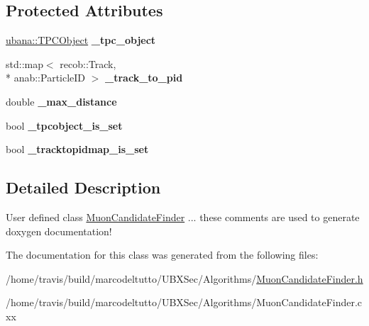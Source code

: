 \subsection*{Protected Attributes}
\begin{DoxyCompactItemize}
\item 
\hypertarget{classubxsec_1_1MuonCandidateFinder_ad9cc15de89d9470bda9d22d1aca4c015}{\hyperlink{classubana_1_1TPCObject}{ubana\-::\-T\-P\-C\-Object} {\bfseries \-\_\-tpc\-\_\-object}}\label{classubxsec_1_1MuonCandidateFinder_ad9cc15de89d9470bda9d22d1aca4c015}

\item 
\hypertarget{classubxsec_1_1MuonCandidateFinder_a83b91e5698c4485fc82020b7aeb15b83}{std\-::map$<$ recob\-::\-Track, \\*
anab\-::\-Particle\-I\-D $>$ {\bfseries \-\_\-track\-\_\-to\-\_\-pid}}\label{classubxsec_1_1MuonCandidateFinder_a83b91e5698c4485fc82020b7aeb15b83}

\item 
\hypertarget{classubxsec_1_1MuonCandidateFinder_a4f3bdddbb7e6f506410b493d8537285f}{double {\bfseries \-\_\-max\-\_\-distance}}\label{classubxsec_1_1MuonCandidateFinder_a4f3bdddbb7e6f506410b493d8537285f}

\item 
\hypertarget{classubxsec_1_1MuonCandidateFinder_acb67a07e9887ac0963c7fc16290438e0}{bool {\bfseries \-\_\-tpcobject\-\_\-is\-\_\-set}}\label{classubxsec_1_1MuonCandidateFinder_acb67a07e9887ac0963c7fc16290438e0}

\item 
\hypertarget{classubxsec_1_1MuonCandidateFinder_a1701c31f05e4f6fcae51417f6cd5d086}{bool {\bfseries \-\_\-tracktopidmap\-\_\-is\-\_\-set}}\label{classubxsec_1_1MuonCandidateFinder_a1701c31f05e4f6fcae51417f6cd5d086}

\end{DoxyCompactItemize}


\subsection{Detailed Description}
User defined class \hyperlink{classubxsec_1_1MuonCandidateFinder}{Muon\-Candidate\-Finder} ... these comments are used to generate doxygen documentation! 

The documentation for this class was generated from the following files\-:\begin{DoxyCompactItemize}
\item 
/home/travis/build/marcodeltutto/\-U\-B\-X\-Sec/\-Algorithms/\hyperlink{MuonCandidateFinder_8h}{Muon\-Candidate\-Finder.\-h}\item 
/home/travis/build/marcodeltutto/\-U\-B\-X\-Sec/\-Algorithms/Muon\-Candidate\-Finder.\-cxx\end{DoxyCompactItemize}
